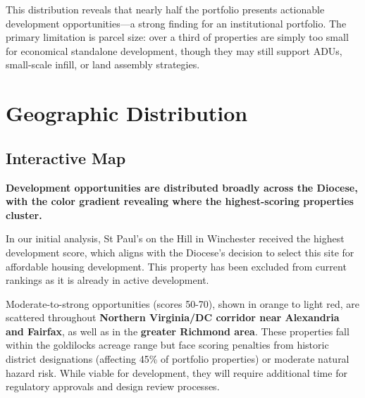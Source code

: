 \documentclass[
  letterpaper,
  DIV=11,
  numbers=noendperiod,
  oneside]{scrreprt}
\begin{document}
This distribution reveals that nearly half the portfolio presents
actionable development opportunities---a strong finding for an
institutional portfolio. The primary limitation is parcel size: over a
third of properties are simply too small for economical standalone
development, though they may still support ADUs, small-scale infill, or
land assembly strategies.

\chapter{Geographic Distribution}\label{geographic-distribution-1}

\section{Interactive Map}\label{interactive-map}

\textbf{Development opportunities are distributed broadly across the
Diocese, with the color gradient revealing where the highest-scoring
properties cluster.}

\begin{tcolorbox}[enhanced jigsaw, bottomtitle=1mm, left=2mm, rightrule=.15mm, colbacktitle=quarto-callout-tip-color!10!white, arc=.35mm, title=\textcolor{quarto-callout-tip-color}{\faLightbulb}\hspace{0.5em}{Validation: St Paul's on the Hill}, bottomrule=.15mm, colback=white, colframe=quarto-callout-tip-color-frame, leftrule=.75mm, titlerule=0mm, opacitybacktitle=0.6, breakable, coltitle=black, toptitle=1mm, toprule=.15mm, opacityback=0]

In our initial analysis, St Paul's on the Hill in Winchester received
the highest development score, which aligns with the Diocese's decision
to select this site for affordable housing development. This property
has been excluded from current rankings as it is already in active
development.

\end{tcolorbox}

Moderate-to-strong opportunities (scores 50-70), shown in orange to
light red, are scattered throughout \textbf{Northern Virginia/DC
corridor near Alexandria and Fairfax}, as well as in the \textbf{greater
Richmond area}. These properties fall within the goldilocks acreage
range but face scoring penalties from historic district designations
(affecting 45\% of portfolio properties) or moderate natural hazard
risk. While viable for development, they will require additional time
for regulatory approvals and design review processes.
\end{document}
